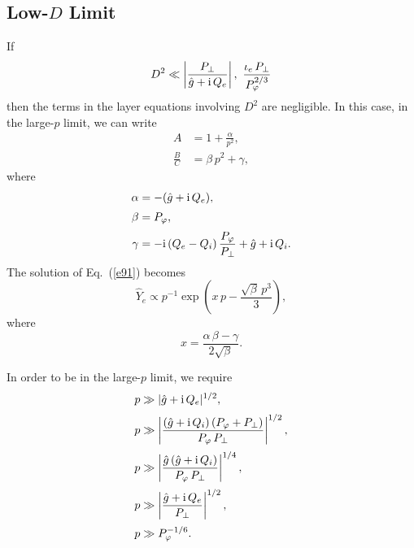 \documentclass[12pt,prb,aps,notitlepage]{revtex4-1}
\begin{document}
\subsection{Low-$D$ Limit}\label{lowd}
If
\begin{align}
D^2\ll \left|\frac{P_\perp}{\hat{g} + {\rm i}\,Q_e}\right|, ~\frac{\iota_e\,P_\perp}{P_\varphi^{2/3}}
\end{align}
then the terms in the layer equations involving $D^2$ are negligible. In this case, in the large-$p$ limit,  we can write
\begin{align}
A&= 1+\frac{\alpha}{p^2},\\[0.5ex]
\frac{B}{C} &= \beta\,p^2+\gamma,
\end{align}
where
\begin{align}
\alpha &= - (\hat{g}+{\rm i}\,Q_e),\\[0.5ex]
\beta &= P_\varphi,\\[0.5ex]
\gamma&= -{\rm i}\,(Q_e-Q_i)\,\frac{P_\varphi}{P_\perp} + \hat{g} + {\rm i}\,Q_i.
\end{align}
The solution of Eq.~(\ref{e91}) becomes
\begin{equation}
\hat{Y}_e\propto p^{-1}\exp\left(x\,p - \frac{\sqrt{\beta}\,p^3}{3}\right),
\end{equation}
where
\begin{equation}
x = \frac{\alpha\,\beta-\gamma}{2\sqrt{\beta}}.
\end{equation}

In order to be in the large-$p$ limit, we require
\begin{align}
p&\gg |\hat{g}+{\rm i}\,Q_e|^{1/2},\\[0.5ex]
p&\gg\left|\frac{(\hat{g}+{\rm i}\,Q_i)\,(P_\varphi + P_\perp)}{P_\varphi\,P_\perp}\right|^{1/2},\\[0.5ex]
p&\gg \left|\frac{\hat{g}\,(\hat{g}+{\rm i}\,Q_i)}{P_\varphi\,P_\perp}\right|^{1/4},\\[0.5ex]
p&\gg \left|\frac{\hat{g}+{\rm i}\,Q_e}{P_\perp}\right|^{1/2},\\[0.5ex]
p&\gg P_\varphi^{-1/6}.
\end{align} 
\end{document}
